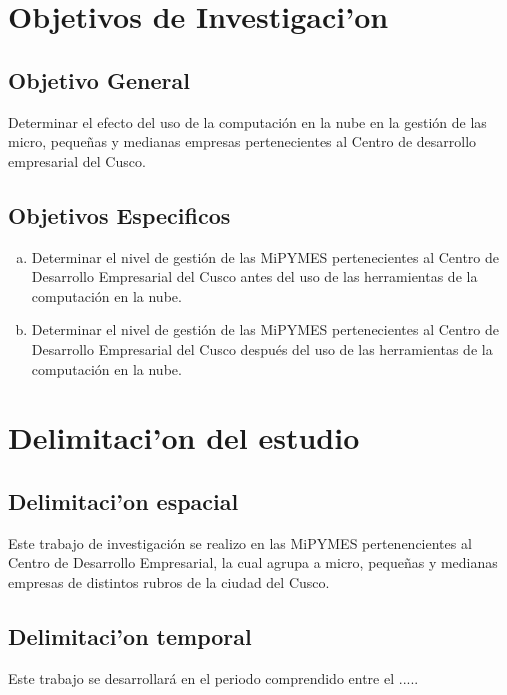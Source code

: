 \section{Objetivos de Investigaci'on}
\subsection{Objetivo General}
Determinar el efecto del uso de la computaci\'on en la nube en la gesti\'on de
las micro, peque\~nas y medianas empresas pertenecientes al Centro de desarrollo
empresarial del Cusco.
\subsection{Objetivos Especificos}
\begin{enumerate}[a.]
\item Determinar el nivel de gesti\'on de las MiPYMES pertenecientes al Centro de
Desarrollo Empresarial del Cusco antes del uso de las herramientas de la
computaci\'on en la nube.
\item Determinar el nivel de gesti\'on de las MiPYMES pertenecientes al Centro de
Desarrollo Empresarial del Cusco despu\'es del uso de las herramientas de la
computaci\'on en la nube.
\end{enumerate}
\section{Delimitaci'on del estudio}
\subsection{Delimitaci'on espacial}
Este trabajo de investigaci\'on se realizo en las MiPYMES pertenencientes al
Centro de Desarrollo Empresarial, la cual agrupa a micro, peque\~nas y
medianas empresas de distintos rubros de la ciudad del Cusco.

\subsection{Delimitaci'on temporal}
Este trabajo se desarrollar\'a en el periodo comprendido entre el .....
